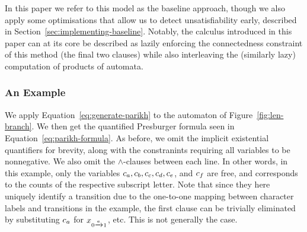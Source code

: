 \documentclass[acmsmall,review,anonymous]{acmart}\settopmatter{printfolios=true,printccs=false,printacmref=true}
\theoremstyle{definition}
\begin{document}
In this paper we refer to this model as the baseline approach, though we also
apply some optimisations that allow us to detect unsatisfiability early,
described in Section~\ref{sec:implementing-baseline}. Notably, the calculus
introduced in this paper can at its core be described as lazily enforcing the
connectedness constraint of this method (the final two clauses) while also
interleaving the (similarly lazy) computation of products of automata.

\subsubsection{An Example}
We apply Equation~\ref{eq:generate-parikh} to the automaton of Figure~\ref{fig:len-branch}. We then get the quantified Presburger formula seen in Equation~\ref{eq:parikh-formula}. As before, we omit the implicit existential quantifiers for brevity, along with the constranints requiring all variables to be nonnegative. We also omit the $\land$-clauses between each line. In other words, in this example, only the variables $c_a, c_b, c_c, c_d, c_e$, and $c_f$ are free, and corresponds to the counts of the respective subscript letter. Note that since they here uniquely identify a transition due to the one-to-one mapping between character labels and transitions in the example, the first clause can be trivially eliminated by substituting $c_a$ for $x_{0 \xrightarrow{a} 1}$, etc. This is not generally the case.
\end{document}
